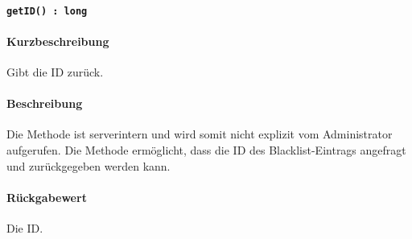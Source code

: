 \paragraph{\texttt{getID() : long}}%
\paragraph*{Kurzbeschreibung}
Gibt die ID zurück.
\paragraph*{Beschreibung}
Die Methode ist serverintern und wird somit nicht explizit vom Administrator aufgerufen.
Die Methode ermöglicht, dass die ID des Blacklist-Eintrags angefragt und zurückgegeben werden kann.
\paragraph*{Rückgabewert}
Die ID.
